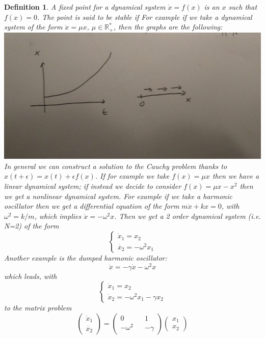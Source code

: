 \documentclass[10pt,a4paper]{book}
\newtheorem{definition}{Definition}
\begin{document}
\begin{definition}
A fixed point for a dynamical system $\dot{x}=f(x)$ is an $x$ such that $f(x)=0$. The point is said to be stable if 
For example if we take a dynamical system of the form $\dot{x}=\mu x$, $\mu\in\mathbb{R}_+^*$, then the graphs are the following:\\
\includegraphics[scale=0.2]{fig1}\\
In general we can construct a solution to the Cauchy problem thanks to $x(t+\epsilon)=x(t)+\epsilon f(x)$. If for example we take $f(x)=\mu x$ then we have a linear dynamical system; if instead we decide to consider $f(x)=\mu x-x^2$ then we get a nonlinear dynamical system. For example if we take a harmonic oscillator then we get a differential  equation of the form
$m\ddot{x}+kx=0$, with $\omega^2=k/m$, which implies $\ddot{x}=-\omega^2 x$. Then we get a 2 order dynamical system (i.e. N=2) of the form
$$\begin{cases}
\dot{x}_1=x_2\\
\dot{x_2}=-\omega^2x_1
\end{cases}$$
Another example is the dumped harmonic oscillator:
$$\ddot{x}=-\gamma\dot{x}-\omega^2 x$$ which leads, with 
$$\begin{cases}
\dot{x}_1=x_2\\
\dot{x}_2=-\omega^2 x_1-\gamma x_2
\end{cases}$$ to the matrix problem
$$\begin{pmatrix}
\dot{x}_1\\
\dot{x_2}
\end{pmatrix}=
\begin{pmatrix}
0 && 1\\
-\omega^2 && -\gamma
\end{pmatrix}
\begin{pmatrix}
x_1\\
x_2
\end{pmatrix}$$

\end{definition}
\end{document}
